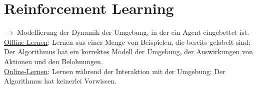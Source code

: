 
\section{Reinforcement Learning}

$\rightarrow$ Modellierung der Dynamik der Umgebung, in der ein Agent eingebettet ist.\\

\underline{Offline-Lernen}: Lernen aus einer Menge von Beispielen, die bereits gelabelt sind; Der Algorithmus hat ein korrektes Modell der Umgebung, der Auswirkungen von Aktionen und den Belohnungen.\\

\underline{Online-Lernen}: Lernen während der Interaktion mit der Umgebung; Der Algorithmus hat keinerlei Vorwissen.





